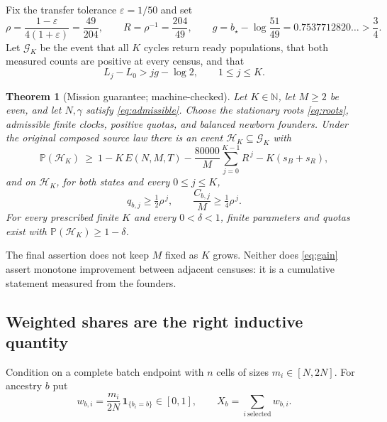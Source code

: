 \documentclass[11pt,a4paper]{article}
\theoremstyle{plain}
\newtheorem{theorem}{Theorem}[section]
\theoremstyle{definition}
\theoremstyle{remark}
\newcommand{\N}{\mathbb N}
\newcommand{\Prob}{\mathbb P}
\newcommand{\eps}{\varepsilon}
\newcommand{\ind}{\mathbf 1}
\begin{document}
Fix the transfer tolerance $\eps=1/50$ and set
\begin{equation}\label{eq:constants}
\rho=\frac{1-\eps}{4(1+\eps)}=\frac{49}{204},\qquad R=\rho^{-1}=\frac{204}{49},
\qquad g=b_\star-\log\frac{51}{49}=0.7537712820\ldots>\frac34 .
\end{equation}
Let $\mathcal G_K$ be the event that all $K$ cycles return ready populations,
that both measured counts are positive at every census, and that
\begin{equation}\label{eq:gain}
L_j-L_0>jg-\log2,\qquad 1\le j\le K .
\end{equation}

\begin{theorem}[Mission guarantee; machine-checked]\label{thm:main}
Let $K\in\N$, let $M\ge2$ be even, and let $N,\gamma$ satisfy
\eqref{eq:admissible}. Choose the stationary roots \eqref{eq:roots}, admissible
finite clocks, positive quotas, and balanced newborn founders. Under the
original composed source law there is an event
$\mathcal H_K\subseteq\mathcal G_K$ with
\begin{equation}\label{eq:prob}
\Prob(\mathcal H_K)\ \ge\
1-K\,E(N,M,T)-\frac{80000}{M}\sum_{j=0}^{K-1}R^{\,j}-K(s_B+s_R),
\end{equation}
and on $\mathcal H_K$, for both states and every $0\le j\le K$,
\begin{equation}\label{eq:floors}
q_{b,j}\ge\tfrac12\rho^{\,j},\qquad \frac{C_{b,j}}{M}\ge\tfrac14\rho^{\,j}.
\end{equation}
For every prescribed finite $K$ and every $0<\delta<1$, finite parameters and
quotas exist with $\Prob(\mathcal H_K)\ge1-\delta$.
\end{theorem}

The final assertion does not keep $M$ fixed as $K$ grows. Neither does
\eqref{eq:gain} assert monotone improvement between adjacent censuses: it is a
cumulative statement measured from the founders.

\subsection{Weighted shares are the right inductive quantity}\label{sec:shares}

Condition on a complete batch endpoint with $n$ cells of sizes
$m_i\in[N,2N]$. For ancestry $b$ put
\begin{equation}\label{eq:weights}
w_{b,i}=\frac{m_i}{2N}\,\ind_{\{b_i=b\}}\in[0,1],\qquad
X_b=\sum_{i\ \mathrm{selected}}w_{b,i}.
\end{equation}
\end{document}
